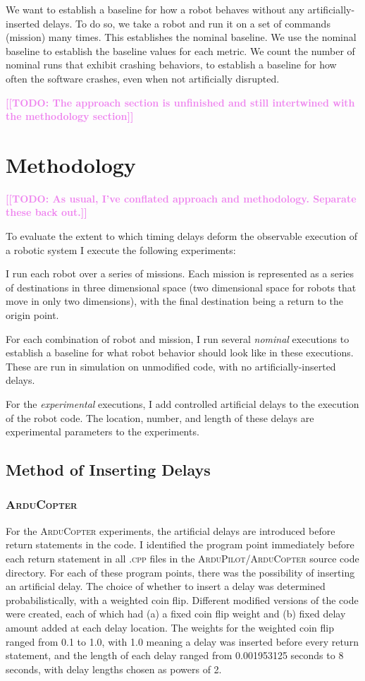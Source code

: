 \documentclass[conference]{IEEEtran}
\newcommand{\todo}[1]{\textcolor{violet}{{\bfseries [[TODO: #1]]}}}
\newcommand{\tool}[1]{\textsc{#1}}
\begin{document}
We want to establish a baseline for how a robot behaves without any artificially-inserted delays. To do so, we take a robot and run it on a set of commands (mission) many times.
This establishes the nominal baseline.
We use the nominal baseline to establish the baseline values for each metric.
We count the number of nominal runs that exhibit crashing behaviors, to establish a baseline for how often the software crashes, even when not artificially disrupted.

\todo{The approach section is unfinished and still intertwined with the methodology section}

\section{Methodology}
\label{sec:timing-methodology}
\todo{As usual, I've conflated approach and methodology. Separate these back out.}

To evaluate the extent to which timing delays deform the observable execution of a robotic system I execute the following experiments:

I run each robot over a series of missions. Each mission is represented as a series of destinations in three dimensional space (two dimensional space for robots that move in only two dimensions), with the final destination being a return to the origin point.

For each combination of robot and mission, I run several \emph{nominal} executions to establish a baseline for what robot behavior should look like in these executions. These are run in simulation on unmodified code, with no artificially-inserted delays.

For the \emph{experimental} executions, I add controlled artificial delays to the execution of the robot code.
The location, number, and length of these delays are experimental parameters to the experiments.
\subsection{Method of Inserting Delays}
\label{sec:timing-methodology-delays}

\subsubsection{\tool{ArduCopter}}
For the \tool{ArduCopter} experiments, the artificial delays are introduced before return statements in the code.
I identified the program point immediately before
each return statement in all \tool{.cpp} files in the
\tool{ArduPilot/ArduCopter} source code directory.
For each of these program points, there was the possibility of inserting an
artificial delay.
The choice of whether to insert a delay was determined probabilistically, with a weighted coin flip.
Different modified versions of the code were created, each of which had
(a) a fixed coin flip weight and
(b) fixed delay amount added at each delay location.
The weights for the weighted coin flip ranged from 0.1 to 1.0, with 1.0
meaning a delay was inserted before every return statement,
and the length of each delay ranged from 0.001953125 seconds to 8 seconds,
with delay lengths chosen as powers of 2.
\end{document}

